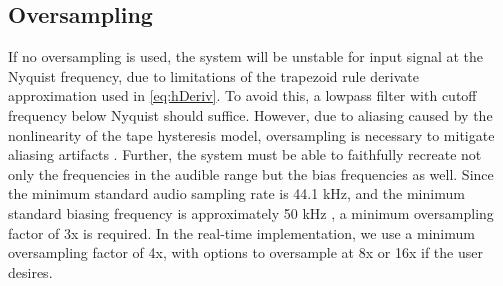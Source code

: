 \documentclass[twoside,a4paper]{article}
\begin{document}
\subsection{Oversampling} %
If no oversampling is used, the system will be unstable
for input signal at the Nyquist frequency, due to limitations
of the trapezoid rule derivate approximation used in \cref{eq:hDeriv}.
To avoid this, a lowpass filter with cutoff frequency below Nyquist
should suffice. However, due to aliasing caused by the nonlinearity
of the tape hysteresis model, oversampling is necessary to mitigate
aliasing artifacts \cite{Yeh}. Further, the system must be able to
faithfully recreate not only the frequencies in the audible range
but the bias frequencies as well. Since the minimum standard audio sampling
rate is 44.1 kHz, and the minimum standard biasing frequency is approximately
50 kHz \cite{Camras:1987:MRH:27189}, a minimum oversampling factor of 3x is
required. In the real-time implementation, we use a minimum
oversampling factor of 4x, with options to oversample at 8x or 16x
if the user desires.

\nocite{*}


\end{document}
